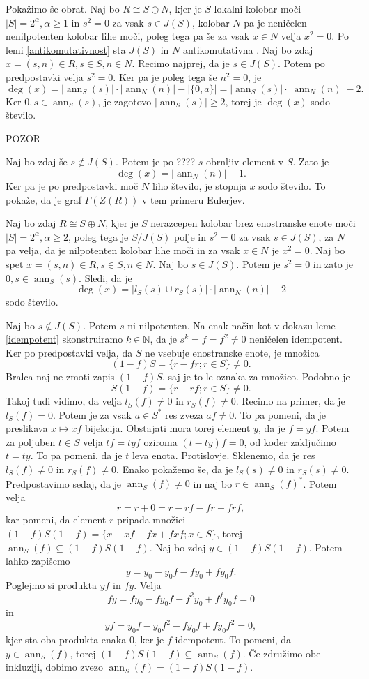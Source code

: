 \documentclass[a4paper, 12pt]{amsart}
\theoremstyle{definition} %
\theoremstyle{plain} %
\newcommand{\N}{\mathbb N}
\DeclareMathOperator{\ann}{ann}
\begin{document}
Pokažimo še obrat. Naj bo $R\cong S\oplus N$, kjer je $S$ lokalni kolobar moči $|S| = 2^{\alpha}, \alpha \ge 1$ in $s^2 = 0 $ za vsak $s\in J(S)$, kolobar $N$ pa je neničelen nenilpotenten kolobar lihe moči, poleg tega pa še za vsak $x\in N$ velja $x^2 = 0$. Po lemi \ref{antikomutativnost} sta $J(S)$ in $N$ antikomutativna . Naj bo zdaj $x= (s,n) \in R, s\in S, n\in N$. Recimo najprej, da je $s\in J(S)$. Potem po predpostavki velja $s^2 = 0$. Ker pa je poleg tega še $n^2 = 0$, je 
$$
\deg(x) = |\ann_S(s)|\cdot|\ann_N(n)| - |\{0,a\}| =   |\ann_S(s)|\cdot|\ann_N(n)| - 2.
$$
Ker $0,s\in \ann_S(s)$, je zagotovo $|\ann_S(s)|\ge 2$, torej je $\deg(x)$ sodo število.

POZOR

Naj bo zdaj še $s\notin J(S)$. Potem je po ???? $s$ obrnljiv element v $S$. Zato je 
$$
\deg(x) = |\ann_N(n)| - 1.
$$
Ker pa je po predpostavki moč $N$ liho število, je stopnja $x$ sodo število. To pokaže, da je graf $\Gamma(Z(R))$ v tem primeru Eulerjev.

Naj bo zdaj $R\cong S\oplus N$, kjer je $S$ nerazcepen kolobar brez enostranske enote moči $|S| = 2^{\alpha}, \alpha \ge 2$, poleg tega je $S/J(S)$ polje in $s^2 = 0$ za vsak $s\in J(S)$, za $N$ pa velja, da je nilpotenten kolobar lihe moči in za vsak $x\in N$ je $x^2 = 0$. Naj bo spet $x=(s,n)\in R, s\in S, n\in N$. Naj bo $s\in J(S)$. Potem je $s^2 = 0$ in zato je $0,s \in \ann_S(s)$. Sledi, da je  
$$
\deg(x) = |l_S(s) \cup r_S(s)|\cdot |\ann_N(n)| - 2
$$
sodo število.

Naj bo $s\notin J(S)$. Potem $s$ ni nilpotenten. Na enak način kot v dokazu leme \ref{idempotent} skonstruiramo $k\in \N$, da je $s^k = f = f^2\neq 0$ neničelen idempotent. Ker po predpostavki velja, da $S$ ne vsebuje enostranske enote, je množica
$$
(1-f)S = \{r-fr; r\in S\}\neq 0.
$$
Bralca naj ne zmoti zapis $(1-f)S$, saj je to le oznaka za množico. Podobno je 
$$
S(1-f) = \{r-rf;r\in S\} \neq 0.
$$
Takoj tudi vidimo, da velja $l_S(f) \neq 0$ in $r_S(f) \neq 0$. Recimo na primer, da je $l_S(f)=0$. Potem je za vsak $a\in S^*$ res zveza $af \neq 0$. To pa pomeni, da je preslikava $x\mapsto xf$ bijekcija. Obstajati mora torej element $y$, da je $f=yf$. Potem za poljuben $t\in S$ velja $tf = tyf$ oziroma $(t-ty)f=0 $, od koder zaključimo $t = ty$. To pa pomeni, da je $t$ leva enota. Protislovje. Sklenemo, da je res $l_S(f) \neq 0$ in $r_S(f) \neq 0$. Enako pokažemo še, da je $l_S(s) \neq 0$ in $r_S(s) \neq 0$. Predpostavimo sedaj, da je $\ann_S(f) \neq 0$ in naj bo $r\in \ann_S(f)^*$. Potem velja
$$
r = r + 0 = r - rf - fr + frf, 
$$
kar pomeni, da element $r$ pripada množici $(1-f)S(1-f) = \{x-xf-fx+fxf; x\in S\}$, torej $\ann_S(f) \subseteq (1-f)S(1-f)$. Naj bo zdaj $y\in (1-f)S(1-f)$. Potem lahko zapišemo 
$$
y = y_0 - y_0 f -f y_0 + fy_0 f.
$$
Poglejmo si produkta $yf$ in $fy$. Velja 
$$
fy = fy_0 - fy_0 f - f^2 y_0 + f^f y_0 f = 0
$$
in
$$
yf = y_0 f - y_0 f^2 - fy_0 f + fy_0 f^2=0,
$$
kjer sta oba produkta enaka 0, ker je $f$ idempotent. To pomeni, da $y\in \ann_S(f)$, torej $(1-f)S(1-f) \subseteq \ann_S(f)$. Če združimo obe inkluziji, dobimo zvezo $\ann_S(f) = (1-f)S(1-f)$.
\end{document}
